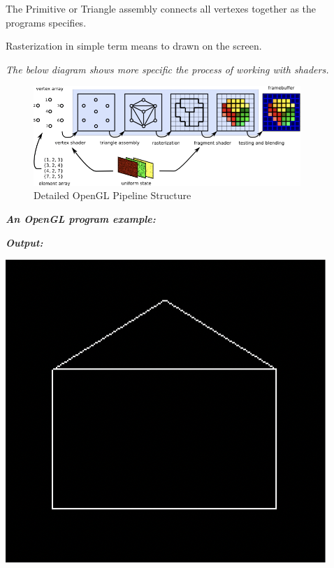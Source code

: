 \documentclass{article}
\begin{document}
The Primitive or Triangle assembly connects all vertexes together as the programs specifies. \par

Rasterization in simple term means to drawn on the screen. \par

\textit{The below diagram shows more specific the process of working with shaders.}

\begin{figure}[h]
\begin{center}
\includegraphics[width=0.9\textwidth]{detail-pipeline}
\caption{Detailed OpenGL Pipeline Structure \footnotemark}
\end{center}
\end{figure}

\begin{multicols}{2}
\textbf{\textit{An OpenGL program example:}}


\columnbreak

\textbf{\textit{Output:}}
\begin{center}
\includegraphics{example-output}
\end{center}
\end{multicols}
\end{document}

